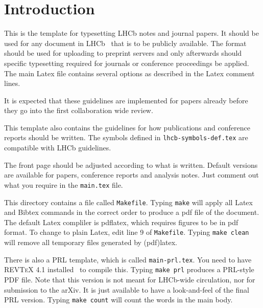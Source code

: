 
\section{Introduction}
\label{sec:Introduction}

This is the template for typesetting LHCb notes and journal papers.
It should be used for any document in LHCb~\cite{Alves:2008zz} that is to be
publicly available. The format should be used for uploading to
preprint servers and only afterwards should specific typesetting
required for journals or conference proceedings be applied. The main
Latex file contains several options as described in the Latex comment
lines.

It is expected that these guidelines are implemented for papers already
before they go into the first collaboration wide review. 

This template also contains the guidelines for how publications and
conference reports should be written. 
The symbols defined in \texttt{lhcb-symbols-def.tex} are compatible with
LHCb guidelines.

The front page should be adjusted according to what is
written. Default versions are available for papers, conference reports
and analysis notes. Just comment out what you require in the
\texttt{main.tex} file.

This directory contains a file called \texttt{Makefile}.
Typing \texttt{make} will apply all Latex and Bibtex commands 
in the correct order to produce a pdf file of the document.
The default Latex compliler is pdflatex, which requires figures 
to be in pdf format. 
To change to plain Latex, edit line 9 of \texttt{Makefile}.
Typing \texttt{make clean} will remove all temporary files generated by (pdf)latex.

There is also a PRL template, which is called \texttt{main-prl.tex}.  You need
to have \textsc{REVTeX 4.1} installed~\cite{REVTeX} to compile this. Typing
\texttt{make prl} produces a PRL-style PDF file. Note that this version is not
meant for LHCb-wide circulation, nor for submission to the arXiv. It is just
available to have a look-and-feel of the final PRL version. Typing \texttt{make
  count} will count the words in the main body.
